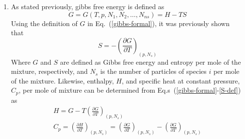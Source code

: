 \documentclass[a4paper]{article}
\newcommand{\eref}[1]{Eq.~(\ref{#1})}
\newcommand{\erefs}[2]{Eq.s~(\ref{#1}-\ref{#2})}
\newcommand{\pd}[2]{\frac{\partial #1}{\partial #2}}
\begin{document}
\begin{enumerate}
    If two gases with the same pressure and temperature are mixed, then
    \eref{ds-final} shows that entropy must be generated, regardless of whether
    chemical reactions occur.  Since entropy of a system of gases is additive,
    \begin{equation}
      dS_{mix} = dS_1 + dS_2
      \label{s-additive}
    \end{equation}
    where $dS_{mix}$ is the change of entropy in the mixture, and $dS_{(1,2)}$
    are the changes in entropy of species being mixed.  If $E = E(T,p)$ and
    there is no change in temperature or pressure, $dE = 0$ for both species;
    however, the volume has changed, so for intert gases mixing there will be
    production of entropy
    \begin{equation}
      dS_{mix} = \frac{p}{T}\left( dV_1 + dV_2 \right)
      \label{smix-change}
    \end{equation}
    Where $dV_1$ and $dV_2$ are the changes in volume for species 1 and 2,
    respectively.  The production of entropy is to be expected, intuitively,
    since the diffusion of one gas into the other happens spontaneously.  Each
    gas will expand into the new volume available after mixing, naturally, and
    it takes effort to separate them; hence $dS_{mix} > 0$.  Likewise, if
    chemical reactions occur, entropy will also be generated as dictated by
    \eref{si-def}.
  \item As stated previously, gibbs free energy is defined as
    \begin{equation}
      G = G(T,p,N_1,N_2,\dots,N_{ns}) = H - TS
      \label{gibbs-formal}
    \end{equation}
    Using the definition of $G$ in \eref{gibbs-formal}, it was previously shown that
    \begin{equation}
      \boxed{ S = -\left( \pd{G}{T} \right)_{(p,N_s)}}
      \label{S-def}
    \end{equation}
    Where $G$ and $S$ are defined as Gibbs free energy and entropy per mole of
    the mixture, respectively, and $N_s$ is the number of particles of species
    $i$ per mole of the mixture.  Likewise, enthalpy, $H$, and specific heat at
    constant pressure, $C_p$, per mole of mixture can be determined from
    \erefs{gibbs-formal}{S-def} as
    \begin{gather}
      \boxed{H = G - T\left( \pd{G}{T} \right)_{(p,N_s)}} \label{h-def} \\
      \boxed{C_p = \left(\pd{H}{T}\right)_{(p,N_s)} 
      = \left( \pd{G}{T} \right)_{(p,N_s)} - \left( \pd{G}{T} \right)_{(p,N_s)}
}
\end{gather}
\end{enumerate}
\end{document}
